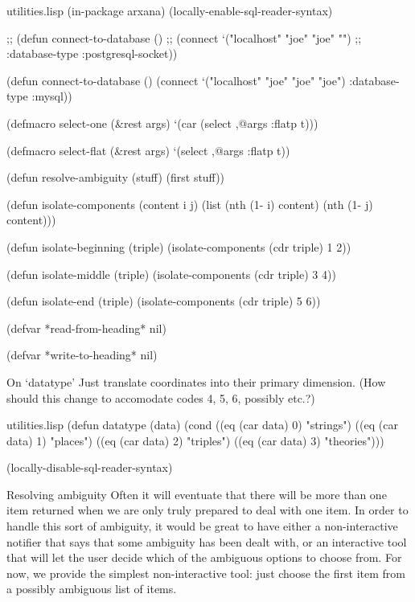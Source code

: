 \begin{common}{utilities.lisp}
(in-package arxana)
(locally-enable-sql-reader-syntax)

;; (defun connect-to-database ()
;;    (connect `("localhost" "joe" "joe" "")
;;             :database-type :postgresql-socket))

(defun connect-to-database ()
   (connect `("localhost" "joe" "joe" "joe")
            :database-type :mysql))

(defmacro select-one (&rest args)
  `(car (select ,@args :flatp t)))

(defmacro select-flat (&rest args)
  `(select ,@args :flatp t))

(defun resolve-ambiguity (stuff)
  (first stuff))

(defun isolate-components (content i j)
  (list (nth (1- i) content)
        (nth (1- j) content)))

(defun isolate-beginning (triple)
  (isolate-components (cdr triple) 1 2))

(defun isolate-middle (triple)
  (isolate-components (cdr triple) 3 4))

(defun isolate-end (triple)
  (isolate-components (cdr triple) 5 6))

(defvar *read-from-heading* nil)

(defvar *write-to-heading* nil)
\end{common}

\begin{notate}{On `datatype'}
Just translate coordinates into their primary dimension.
(How should this change to accomodate codes 4, 5, 6,
possibly etc.?)
\end{notate}

\begin{common}{utilities.lisp}
(defun datatype (data)
  (cond ((eq (car data) 0)
         "strings")
        ((eq (car data) 1)
         "places")
        ((eq (car data) 2)
         "triples")
        ((eq (car data) 3)
         "theories")))

(locally-disable-sql-reader-syntax)
\end{common}

\begin{notate}{Resolving ambiguity}
Often it will eventuate that there will be more than one
item returned when we are only truly prepared to deal with
one item.  In order to handle this sort of ambiguity, it
would be great to have either a non-interactive notifier
that says that some ambiguity has been dealt with, or an
interactive tool that will let the user decide which of
the ambiguous options to choose from.  For now, we provide
the simplest non-interactive tool: just choose the first
item from a possibly ambiguous list of items.
\end{notate}

